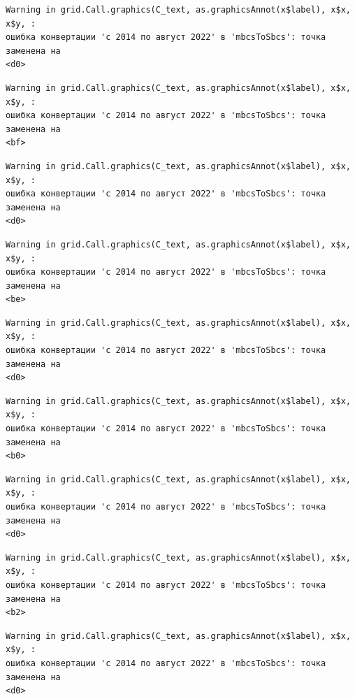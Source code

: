 \documentclass[
  letterpaper,
  DIV=11,
  numbers=noendperiod]{scrreprt}
\begin{document}
\begin{verbatim}
Warning in grid.Call.graphics(C_text, as.graphicsAnnot(x$label), x$x, x$y, :
ошибка конвертации 'с 2014 по август 2022' в 'mbcsToSbcs': точка заменена на
<d0>
\end{verbatim}

\begin{verbatim}
Warning in grid.Call.graphics(C_text, as.graphicsAnnot(x$label), x$x, x$y, :
ошибка конвертации 'с 2014 по август 2022' в 'mbcsToSbcs': точка заменена на
<bf>
\end{verbatim}

\begin{verbatim}
Warning in grid.Call.graphics(C_text, as.graphicsAnnot(x$label), x$x, x$y, :
ошибка конвертации 'с 2014 по август 2022' в 'mbcsToSbcs': точка заменена на
<d0>
\end{verbatim}

\begin{verbatim}
Warning in grid.Call.graphics(C_text, as.graphicsAnnot(x$label), x$x, x$y, :
ошибка конвертации 'с 2014 по август 2022' в 'mbcsToSbcs': точка заменена на
<be>
\end{verbatim}

\begin{verbatim}
Warning in grid.Call.graphics(C_text, as.graphicsAnnot(x$label), x$x, x$y, :
ошибка конвертации 'с 2014 по август 2022' в 'mbcsToSbcs': точка заменена на
<d0>
\end{verbatim}

\begin{verbatim}
Warning in grid.Call.graphics(C_text, as.graphicsAnnot(x$label), x$x, x$y, :
ошибка конвертации 'с 2014 по август 2022' в 'mbcsToSbcs': точка заменена на
<b0>
\end{verbatim}

\begin{verbatim}
Warning in grid.Call.graphics(C_text, as.graphicsAnnot(x$label), x$x, x$y, :
ошибка конвертации 'с 2014 по август 2022' в 'mbcsToSbcs': точка заменена на
<d0>
\end{verbatim}

\begin{verbatim}
Warning in grid.Call.graphics(C_text, as.graphicsAnnot(x$label), x$x, x$y, :
ошибка конвертации 'с 2014 по август 2022' в 'mbcsToSbcs': точка заменена на
<b2>
\end{verbatim}

\begin{verbatim}
Warning in grid.Call.graphics(C_text, as.graphicsAnnot(x$label), x$x, x$y, :
ошибка конвертации 'с 2014 по август 2022' в 'mbcsToSbcs': точка заменена на
<d0>
\end{verbatim}
\end{document}
